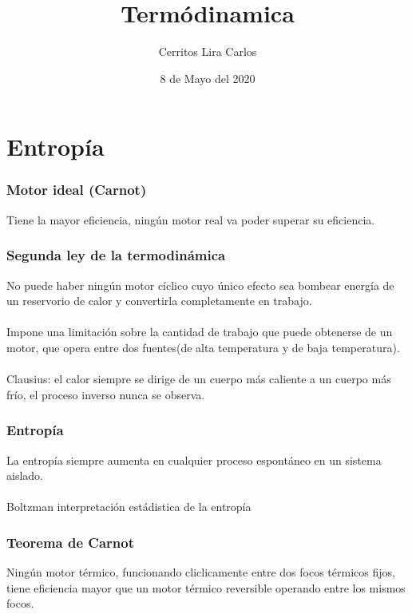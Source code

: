 \documentclass{article}
\title{Termódinamica}
\author{Cerritos Lira Carlos}
\date{8 de Mayo del 2020}
\begin{document}
\maketitle
\section*{Entropía}
\subsubsection*{Motor ideal (Carnot)}
Tiene la mayor eficiencia, ningún motor real va poder 
superar su eficiencia. 
\subsubsection*{Segunda ley de la termodinámica}
No puede haber ningún motor cíclico cuyo único efecto sea bombear energía 
de un reservorio de calor y convertirla completamente en trabajo. \\ \\
Impone una limitación sobre la cantidad de trabajo que puede obtenerse de un 
motor, que opera entre dos fuentes(de alta temperatura y de baja temperatura). \\ \\
Clausius: el calor siempre se dirige de un cuerpo más caliente a un cuerpo más frío, 
el proceso inverso nunca se observa.
\subsubsection*{Entropía}
La entropía siempre aumenta en cualquier proceso espontáneo 
en un sistema aislado. \\ \\ 
Boltzman interpretación estádistica de la entropía
\subsubsection*{Teorema de Carnot}
Ningún motor térmico, funcionando cliclicamente entre dos focos térmicos fijos, tiene 
eficiencia mayor que un motor térmico reversible operando entre los mismos focos. 
\end{document}
